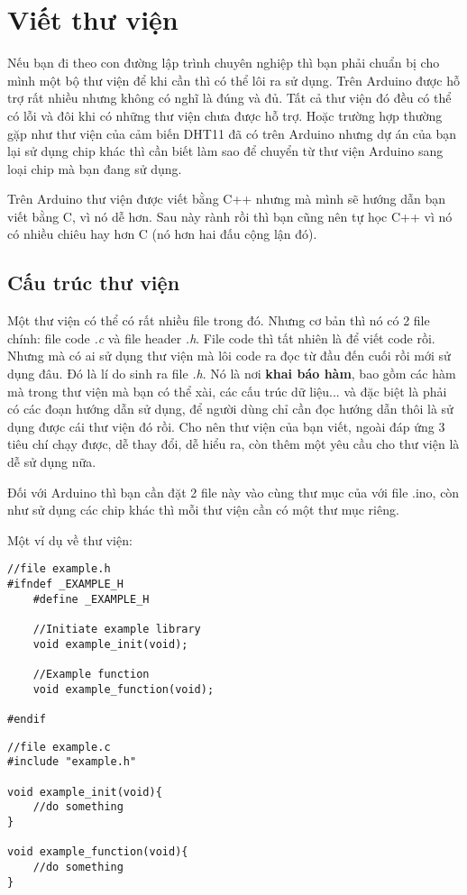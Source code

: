 \chapter{Viết thư viện}

Nếu bạn đi theo con đường lập trình chuyên nghiệp thì bạn phải chuẩn bị cho mình một bộ thư viện để khi cần thì có thể lôi ra sử dụng. Trên Arduino được hỗ trợ rất nhiều nhưng không có nghĩ là đúng và  đủ. Tất cả thư viện đó đều có thể có lỗi và đôi khi có những thư viện chưa được hỗ trợ. Hoặc trường hợp thường gặp như thư viện của cảm biến DHT11 đã có trên Arduino nhưng dự án của bạn lại sử dụng chip khác thì cần biết làm sao để chuyển từ thư viện Arduino sang loại chip mà bạn đang sử dụng.

Trên Arduino thư viện được viết bằng C++ nhưng mà mình sẽ hướng dẫn bạn viết bằng C, vì nó dễ hơn. Sau này rành rồi thì bạn cũng nên tự học C++ vì nó có nhiều chiêu hay hơn C (nó hơn hai đấu cộng lận đó).
\section{Cấu trúc thư viện}

Một thư viện có thể có rất nhiều file trong đó. Nhưng cơ bản thì nó có 2 file chính: file code \textit{.c} và file header \textit{.h}. File code thì tất nhiên là để viết code rồi. Nhưng mà có ai sử dụng thư viện mà lôi code ra đọc từ đầu đến cuối rồi mới sử dụng đâu. Đó là lí do sinh ra file \textit{.h}. Nó là nơi \textbf{khai báo hàm}, bao gồm các hàm mà trong thư viện mà bạn có thể xài, các cấu trúc dữ liệu... và đặc biệt là phải có các đoạn hướng dẫn sử dụng, để người dùng chỉ cần đọc hướng dẫn thôi là sử dụng được cái thư viện đó rồi. Cho nên thư viện của bạn viết, ngoài đáp ứng 3 tiêu chí chạy được, dễ thay đổi, dễ hiểu ra, còn thêm một yêu cầu cho thư viện là dễ sử dụng nữa.

Đối với Arduino thì bạn cần đặt 2 file này vào cùng thư mục của với file .ino, còn như sử dụng các chip khác thì mỗi thư viện cần có một thư mục riêng.

Một ví dụ về thư viện:
\begin{lstlisting}
//file example.h
#ifndef _EXAMPLE_H
	#define _EXAMPLE_H

	//Initiate example library 
	void example_init(void);

	//Example function
	void example_function(void);

#endif
\end{lstlisting}

\begin{lstlisting}
//file example.c
#include "example.h"

void example_init(void){
	//do something
}

void example_function(void){
	//do something
}

\end{lstlisting}


